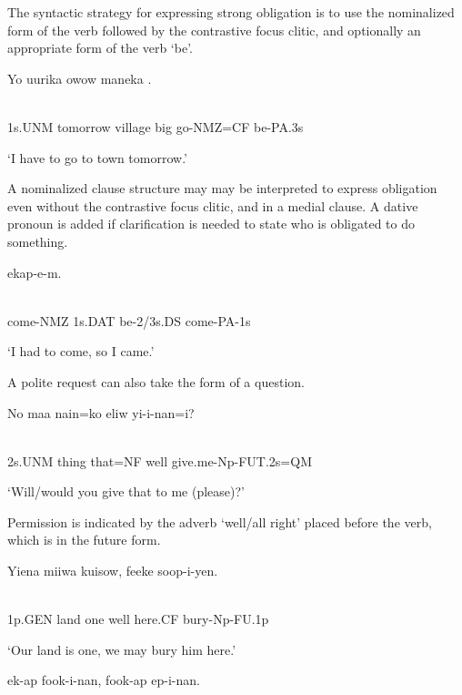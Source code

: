 The syntactic strategy for expressing strong obligation is to use the nominalized form of the verb followed by the contrastive focus clitic, and optionally an appropriate form of the verb `be'. 

\ea%
\label{ex:x1077}
\gll Yo  uurika  owow  maneka  . \\
      \\
\glt
\z

1s.UNM  tomorrow  village  big  go-NMZ=CF  be-PA.3s

`I have to go to town tomorrow.'

A nominalized clause structure may may be interpreted to express obligation even without the contrastive focus clitic, and in a medial clause. A dative pronoun is added if clarification is needed to state who is obligated to do something. 

\ea%
\label{ex:x1079}
\gll {}  ekap-e-m. \\
      \\
\glt
\z

come-NMZ  1s.DAT  be-2/3s.DS  come-PA-1s

`I had to come, so I came.'

A polite request can also take the form of a question.

\ea%
\label{ex:x1163}
\gll No  maa  nain=ko  eliw  yi-i-nan=i? \\
      \\
\glt
\z

2s.UNM  thing  that=NF  well  give.me-Np-FUT.2s=QM

`Will/would you give that to me (please)?'

Permission is indicated by the adverb  `well/all right' placed before the verb, which is in the future form.

\ea%
\label{ex:x1085}
\gll Yiena  miiwa  kuisow,    feeke  soop-i-yen. \\
      \\
\glt
\z

1p.GEN  land  one  well  here.CF  bury-Np-FU.1p

`Our land is one, we may bury him here.'

\ea%
\label{ex:x1086}
\gll {}  ek-ap  fook-i-nan,  fook-ap  ep-i-nan. \\
      \\
\glt
\z

